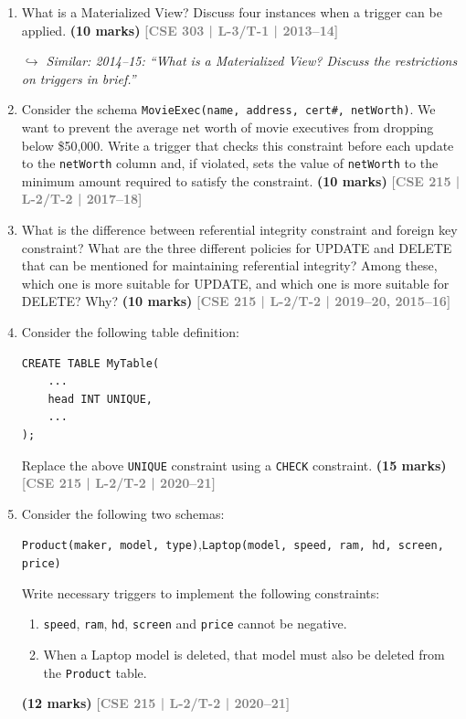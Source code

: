 \documentclass[12pt,a3paper]{article}
\newcommand{\yr}[1]{\hfill\textcolor{gray}{\small\textbf{[#1]}}}
\newcommand{\mk}[1]{\textcolor{orange!70!black}{\small\textbf{(#1 marks)}}}
\newcommand{\variant}[1]{\par\vspace{1pt}\textcolor{blue!50!black}%
  {\footnotesize\textit{$\hookrightarrow$ Similar: #1}}}
\begin{document}
\begin{enumerate}
\item What is a Materialized View? Discuss four instances when a trigger can be applied.
\mk{10} \yr{CSE 303 | L-3/T-1 | 2013--14}

\variant{2014--15: ``What is a Materialized View? Discuss the restrictions on triggers in brief.''}

\item Consider the schema \texttt{MovieExec(name, address, cert\#, netWorth)}. We want to prevent the average net worth of movie executives from dropping below \$50,000. Write a trigger that checks this constraint before each update to the \texttt{netWorth} column and, if violated, sets the value of \texttt{netWorth} to the minimum amount required to satisfy the constraint.
\mk{10} \yr{CSE 215 | L-2/T-2 | 2017--18}

\item What is the difference between referential integrity constraint and foreign key constraint? What are the three different policies for UPDATE and DELETE that can be mentioned for maintaining referential integrity? Among these, which one is more suitable for UPDATE, and which one is more suitable for DELETE? Why?
\mk{10} \yr{CSE 215 | L-2/T-2 | 2019--20, 2015--16}

\item Consider the following table definition:
\begin{lstlisting}
CREATE TABLE MyTable(
    ...
    head INT UNIQUE,
    ...
);
\end{lstlisting}
Replace the above \texttt{UNIQUE} constraint using a \texttt{CHECK} constraint.
\mk{15} \yr{CSE 215 | L-2/T-2 | 2020--21}

\item Consider the following two schemas:
\begin{center}
\texttt{Product(maker, model, type)},\quad \texttt{Laptop(model, speed, ram, hd, screen, price)}
\end{center}
Write necessary triggers to implement the following constraints:
\begin{enumerate}
  \item \texttt{speed}, \texttt{ram}, \texttt{hd}, \texttt{screen} and \texttt{price} cannot be negative.
  \item When a Laptop model is deleted, that model must also be deleted from the \texttt{Product} table.
\end{enumerate}
 \mk{12} \yr{CSE 215 | L-2/T-2 | 2020--21}


\end{enumerate}
\end{document}
